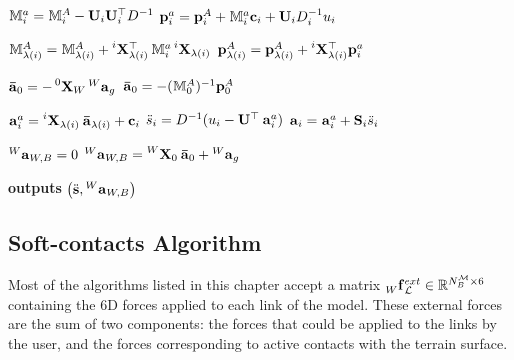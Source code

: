 \begin{algorithm}
\begin{algorithmic}[1]
    \State $\masssix_i^a = \masssix_i^A - \mathbf{U}_i \mathbf{U}_i^\top D^{-1}$
    \State $\mathbf{p}_i^a = \mathbf{p}_i^A + \masssix_i^a \mathbf{c}_i + \mathbf{U}_i D_i^{-1} u_i$
    
        \State $\masssix_{\lambda(i)}^A = \masssix_{\lambda(i)}^A + \transvel[i]_{\lambda(i)}^\top \masssix_i^a \transvel[i]_{\lambda(i)}$
        \State $\mathbf{p}_{\lambda(i)}^A = \mathbf{p}_{\lambda(i)}^A + \transvel[i]_{\lambda(i)}^\top \mathbf{p}_i^a$
    \EndIf
\EndFor

    \State $\accsixproper_0 = - \transvel[0]_{W} \accsix[W]_g$
\Else
    \State $\accsixproper_0 = - (\masssix_0^A)^{-1} \mathbf{p}_0^A$
\EndIf

    
    \State $\accsix_i^a = \transvel[i]_{\lambda(i)} \accsixproper_{\lambda(i)} + \mathbf{c}_i$
    \State $\ddot{s}_i = D^{-1}(u_i - \mathbf{U}^\top \accsix_i^a)$
    \State $\accsix_i = \accsix_i^a + \mathbf{S}_i\ddot{s}_i$
\EndFor

\State $\accsix[W]_{W,B} = 0$
    \State $\accsix[W]_{W,B} = \transvel[W]_0 \accsixproper_0 + \accsix[W]_g$
\EndIf

\State \textbf{outputs} $\left( \Shapedd, \accsix[W]_{W,B} \right)$
\end{algorithmic}
\end{algorithm}

\subsection{Soft-contacts Algorithm}

Most of the algorithms listed in this chapter accept a matrix $\forcesix[W]^{ext}_\mathcal{L} \in \realn^{N_B^\mathcal{M}\times6}$ containing the 6D forces applied to each link of the model.
These external forces are the sum of two components: the forces that could be applied to the links by the user, and the forces corresponding to active contacts with the terrain surface.

